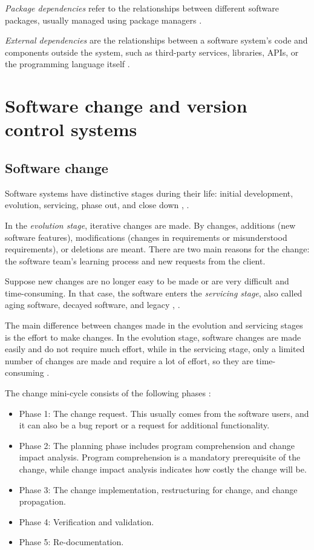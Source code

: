 \textit{Package dependencies} refer to the relationships between different software packages, usually managed using package managers \cite{dep-package}.

\textit{External dependencies} are the relationships between a software system's code and components outside the system, such as third-party services, libraries, APIs, or the programming language itself \cite{dep-external}.




\section{Software change and version control systems}

\subsection{Software change}
\label{change}

\hspace{4em}Software systems have distinctive stages during their life: initial development, evolution, servicing, phase out, and close down \cite{Software-life-cycle}, \cite{model-bennett}.

In the \textit{evolution stage}, iterative changes are made. By changes, additions (new software features), modifications (changes in requirements or misunderstood requirements), or deletions are meant. There are two main reasons for the change: the software team's learning process and new requests from the client.

Suppose new changes are no longer easy to be made or are very difficult and time-consuming. In that case, the software enters the \textit{servicing stage}, also called aging software, decayed software, and legacy \cite{Software-life-cycle}, \cite{363157}.

The main difference between changes made in the evolution and servicing stages is the effort to make changes. In the evolution stage, software changes are made easily and do not require much effort, while in the servicing stage, only a limited number of changes are made and require a lot of effort, so they are time-consuming \cite{Bennett, Rajlich, FoSEReverseEngineering}.

The change mini-cycle consists of the following phases \cite{810308}:
\begin{itemize}
\item Phase 1: The change request. This usually comes from the software users, and it can also be a bug report or a request for additional functionality.
\item Phase 2: The planning phase includes program comprehension and change impact analysis. Program comprehension is a mandatory prerequisite of the change, while change
impact analysis indicates how costly the change will be. \cite{Bohner}
\item Phase 3: The change implementation, restructuring for change, and change propagation.
\item Phase 4: Verification and validation.
\item Phase 5: Re-documentation.
\end{itemize}

